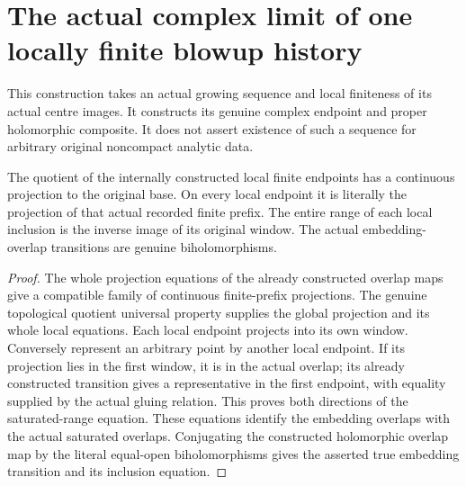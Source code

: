 \section{The actual complex limit of one locally finite blowup history}

This construction takes an actual growing sequence and local finiteness of
its actual centre images. It constructs its genuine complex endpoint and
proper holomorphic composite. It does not assert existence of such a sequence
for arbitrary original noncompact analytic data.

\begin{theorem}
\label{hir:actual-locally-finite-history-limit-projection}
\leanok
The quotient of the internally constructed local finite endpoints has a
continuous projection to the original base. On every local endpoint it is
literally the projection of that actual recorded finite prefix. The entire
range of each local inclusion is the inverse image of its original window.
The actual embedding-overlap transitions are genuine biholomorphisms.
\end{theorem}
\begin{proof}
The whole projection equations of the already constructed overlap maps give
a compatible family of continuous finite-prefix projections. The genuine
topological quotient universal property supplies the global projection and
its whole local equations. Each local endpoint projects into its own
window. Conversely represent an arbitrary point by another local endpoint.
If its projection lies in the first window, it is in the actual overlap;
its already constructed transition gives a representative in the first
endpoint, with equality supplied by the actual gluing relation. This proves
both directions of the saturated-range equation. These equations identify
the embedding overlaps with the actual saturated overlaps. Conjugating the
constructed holomorphic overlap map by the literal equal-open
biholomorphisms gives the asserted true embedding transition and its
inclusion equation.
\end{proof}

